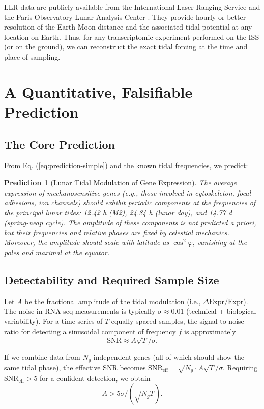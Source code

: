 \documentclass[12pt,a4paper]{article}
\newtheorem{prediction}[theorem]{Prediction}
\theoremstyle{remark}
\begin{document}
	LLR data are publicly available from the International Laser Ranging Service \cite{ILRS} and the Paris Observatory Lunar Analysis Center \cite{LLR-POLAC}. They provide hourly or better resolution of the Earth‑Moon distance and the associated tidal potential at any location on Earth. Thus, for any transcriptomic experiment performed on the ISS (or on the ground), we can reconstruct the exact tidal forcing at the time and place of sampling.
	
	\section{A Quantitative, Falsifiable Prediction}
	\label{sec:prediction}
	
	\subsection{The Core Prediction}
	
	From Eq. (\ref{eq:prediction-simple}) and the known tidal frequencies, we predict:
	
	\begin{prediction}[Lunar Tidal Modulation of Gene Expression]
		The average expression of mechanosensitive genes (e.g., those involved in cytoskeleton, focal adhesions, ion channels) should exhibit periodic components at the frequencies of the principal lunar tides: 12.42 h (M2), 24.84 h (lunar day), and 14.77 d (spring‑neap cycle). The amplitude of these components is not predicted a priori, but their frequencies and relative phases are fixed by celestial mechanics. Moreover, the amplitude should scale with latitude as \(\cos^2\varphi\), vanishing at the poles and maximal at the equator.
	\end{prediction}
	
	\subsection{Detectability and Required Sample Size}
	
	Let \(A\) be the fractional amplitude of the tidal modulation (i.e., \(\Delta\text{Expr}/\text{Expr}\)). The noise in RNA‑seq measurements is typically \(\sigma \approx 0.01\) (technical + biological variability). For a time series of \(T\) equally spaced samples, the signal‑to‑noise ratio for detecting a sinusoidal component of frequency \(f\) is approximately
	\[
	\mathrm{SNR} \approx A \sqrt{T} / \sigma .
	\]
	
	If we combine data from \(N_g\) independent genes (all of which should show the same tidal phase), the effective SNR becomes \(\mathrm{SNR}_{\text{eff}} = \sqrt{N_g} \cdot A \sqrt{T} / \sigma\). Requiring \(\mathrm{SNR}_{\text{eff}} > 5\) for a confident detection, we obtain
	\[
	A > 5 \sigma / (\sqrt{N_g T}).
	\]
	
\end{document}
